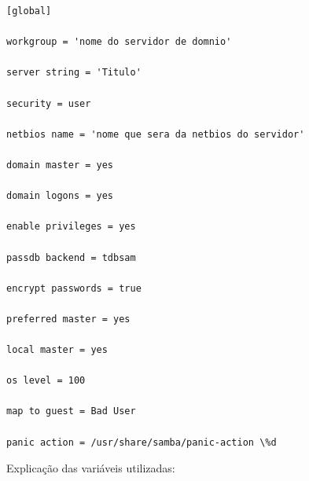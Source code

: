 \begin{lstlisting}	
[global] 

workgroup = 'nome do servidor de domnio'

server string = 'Titulo'       

security = user

netbios name = 'nome que sera da netbios do servidor'

domain master = yes

domain logons = yes

enable privileges = yes

passdb backend = tdbsam
	
encrypt passwords = true

preferred master = yes

local master = yes

os level = 100

map to guest = Bad User

panic action = /usr/share/samba/panic-action \%d	
\end{lstlisting}

Explicação das variáveis utilizadas:

